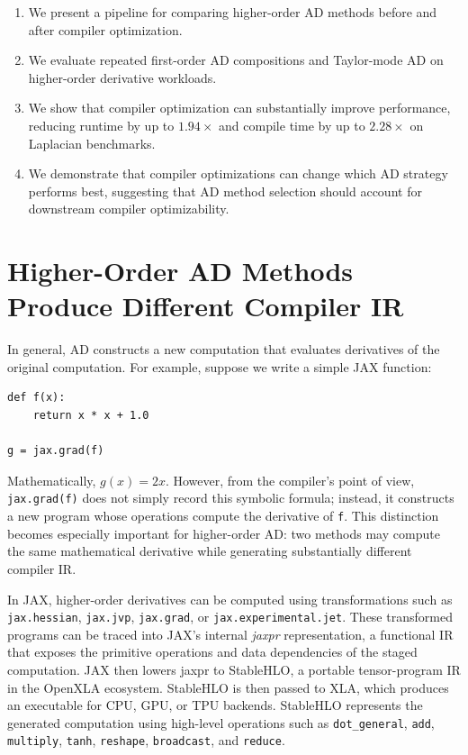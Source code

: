 \documentclass{article}
\theoremstyle{plain}
\theoremstyle{definition}
\theoremstyle{remark}
\begin{document}
\begin{enumerate}
    \item We present a pipeline for comparing higher-order AD methods before and after compiler optimization.
    \item We evaluate repeated first-order AD compositions and Taylor-mode AD on higher-order derivative workloads.
    \item We show that compiler optimization can substantially improve performance, reducing runtime by up to \(1.94\times\) and compile time by up to \(2.28\times\) on Laplacian benchmarks.
    \item We demonstrate that compiler optimizations can change which AD strategy performs best, suggesting that AD method selection should account for downstream compiler optimizability.
\end{enumerate}

\section{Higher-Order AD Methods Produce Different Compiler IR}

In general, AD constructs a new computation that evaluates derivatives of the original computation. For example, suppose we write a simple JAX function:
\begin{verbatim}
def f(x):
    return x * x + 1.0

g = jax.grad(f)
\end{verbatim}

Mathematically, $g(x)=2x$. However, from the compiler's point of view, \texttt{jax.grad(f)} does not simply record this symbolic formula; instead, it constructs a new program whose operations compute the derivative of \texttt{f}. This distinction becomes especially important for higher-order AD:
two methods may compute the same mathematical derivative while generating
substantially different compiler IR.

In JAX, higher-order derivatives can be computed using transformations such as
\texttt{jax.hessian}, \texttt{jax.jvp}, \texttt{jax.grad}, or \texttt{jax.experimental.jet}. These transformed programs can be traced into JAX's internal \emph{jaxpr}
representation, a functional IR that exposes the primitive operations and data
dependencies of the staged computation. JAX then lowers jaxpr to StableHLO, a
portable tensor-program IR in the OpenXLA ecosystem. StableHLO is then passed to
XLA, which produces an
executable for CPU, GPU, or TPU backends. StableHLO represents the generated
computation using high-level operations such as \texttt{dot\_general},
\texttt{add}, \texttt{multiply}, \texttt{tanh}, \texttt{reshape},
\texttt{broadcast}, and \texttt{reduce}.
\end{document}
